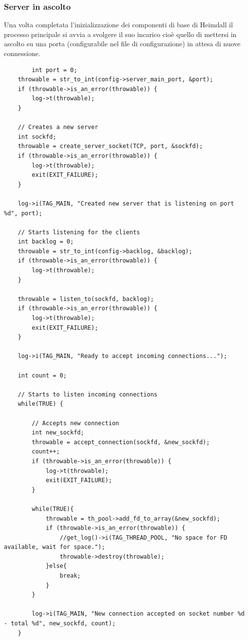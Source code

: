 \documentclass[italian]{tktltiki2}
\begin{document}
\subsubsection{Server in ascolto}
\label{sec:main_server}
Una volta completata l'inizializzazione dei componenti di base di Heimdall il processo principale si avvia a svolgere il suo incarico cioè quello di mettersi in ascolto su una porta (configurabile nel file di configurazione) in attesa di nuove connessione.
\begin{lstlisting}
	    int port = 0;
    throwable = str_to_int(config->server_main_port, &port);
    if (throwable->is_an_error(throwable)) {
        log->t(throwable);
    }

    // Creates a new server
    int sockfd;
    throwable = create_server_socket(TCP, port, &sockfd);
    if (throwable->is_an_error(throwable)) {
        log->t(throwable);
        exit(EXIT_FAILURE);
    } 

    log->i(TAG_MAIN, "Created new server that is listening on port %d", port);

    // Starts listening for the clients
    int backlog = 0;
    throwable = str_to_int(config->backlog, &backlog);
    if (throwable->is_an_error(throwable)) {
        log->t(throwable);
    }

    throwable = listen_to(sockfd, backlog);
    if (throwable->is_an_error(throwable)) {
        log->t(throwable);
        exit(EXIT_FAILURE);
    } 

    log->i(TAG_MAIN, "Ready to accept incoming connections...");

    int count = 0;

    // Starts to listen incoming connections
    while(TRUE) {

        // Accepts new connection
        int new_sockfd;
        throwable = accept_connection(sockfd, &new_sockfd);
        count++;
        if (throwable->is_an_error(throwable)) {
            log->t(throwable);
            exit(EXIT_FAILURE);
        }

        while(TRUE){
            throwable = th_pool->add_fd_to_array(&new_sockfd);
            if (throwable->is_an_error(throwable)) {
                //get_log()->i(TAG_THREAD_POOL, "No space for FD available, wait for space.");
                throwable->destroy(throwable);
            }else{
                break;
            }
        }

        log->i(TAG_MAIN, "New connection accepted on socket number %d - total %d", new_sockfd, count);
    }
\end{lstlisting}
\end{document}
